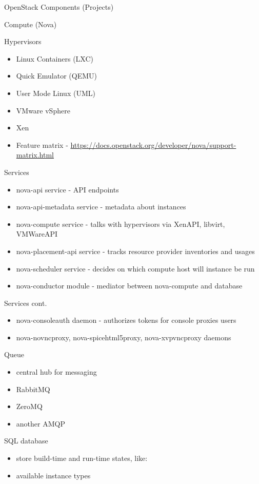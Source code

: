 \documentclass[presentation]{beamer}
\begin{document}
\begin{frame}[fragile,label={sec:orgdf62090}]{OpenStack Components (Projects)}
\begin{block}{Compute (Nova)}
\begin{block}{Hypervisors}
\begin{itemize}
\item Linux Containers (LXC)
\item Quick Emulator (QEMU)
\item User Mode Linux (UML)
\item VMware vSphere
\item Xen
\item Feature matrix - \url{https://docs.openstack.org/developer/nova/support-matrix.html}
\end{itemize}
\end{block}
\begin{block}{Services}
\begin{itemize}
\item nova-api service - API endpoints
\item nova-api-metadata service - metadata about instances
\item nova-compute service - talks with hypervisors via XenAPI, libvirt, VMWareAPI
\item nova-placement-api service - tracks resource provider inventories and usages
\item nova-scheduler service - decides on which compute host will instance be run
\item nova-conductor module - mediator between nova-compute and database
\end{itemize}
\end{block}
\begin{block}{Services cont.}
\begin{itemize}
\item nova-consoleauth daemon - authorizes tokens for console proxies users
\item nova-novncproxy, nova-spicehtml5proxy, nova-xvpvncproxy daemons
\end{itemize}
\end{block}
\begin{block}{Queue}
\begin{itemize}
\item central hub for messaging
\item RabbitMQ
\item ZeroMQ
\item another AMQP
\end{itemize}
\end{block}
\begin{block}{SQL database}
\begin{itemize}
\item store build-time and run-time states, like:
\item available instance types

\end{itemize}
\end{block}
\end{block}
\end{frame}
\end{document}
